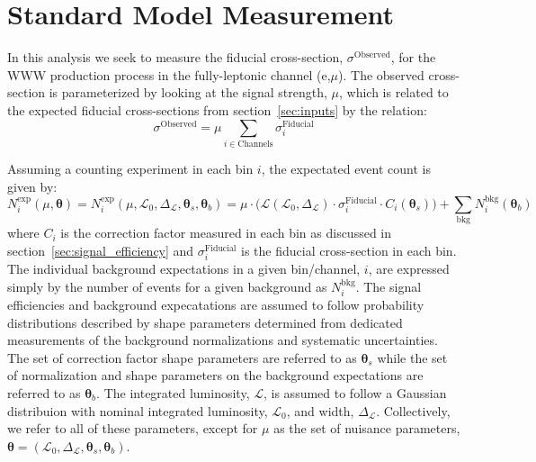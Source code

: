 

\section{Standard Model Measurement}
\label{sec:measurement}
\newcommand*\Diff[1]{\mathop{}\!\mathrm{d}#1~}
\newcommand{\boldtheta}{\boldsymbol{\theta}}
\newcommand{\thetas}{\boldsymbol{\theta}_s}
\newcommand{\thetab}{\boldsymbol{\theta}_b}
\newcommand{\curlyl}{\mathcal{L}}

In this analysis we seek to measure the 
fiducial cross-section, $\sigma^{\textrm{Observed}}$, for the 
WWW production process in the fully-leptonic channel (e,$\mu$).
The observed cross-section is parameterized by looking at the signal
strength, $\mu$, which is related to the expected fiducial cross-sections
from section~\ref{sec:inputs} by the relation:
\begin{equation}
\sigma^{\textrm{Observed}} = \mu \sum_{i\in \textrm{Channels}} \sigma^{\textrm{Fiducial}}_i
\end{equation}

Assuming a counting experiment in each bin $i$, the expectated 
event count is given by:
\begin{equation}
N^{\mathrm{exp}}_i(\mu,\boldtheta) = N^{\mathrm{exp}}_i(\mu,\curlyl_0,\Delta_{\curlyl},\thetas,\thetab) = \mu \cdot \bigg( \curlyl(\curlyl_0,\Delta_{\curlyl}) \cdot \sigma^{\mathrm{Fiducial}}_i \cdot C_i(\thetas) \bigg) + \sum_{\mathrm{bkg}} N_{i}^{\mathrm{bkg}}(\thetab)
\label{eq:poisson_expectation}
\end{equation}
where $C_i$ is the correction factor 
measured in each bin as discussed in section~\ref{sec:signal_efficiency} and 
$\sigma^{\mathrm{Fiducial}}_i$ is the fiducial cross-section in each 
bin. The 
individual background expectations in a given bin/channel, $i$, are 
expressed simply by the number of events
for a given background as $N^{\mathrm{bkg}}_i$. 
The signal efficiencies and background expecatations are assumed to follow 
probability distributions described by shape parameters determined from 
dedicated measurements of the background normalizations and systematic 
uncertainties.  
The set of correction factor shape parameters are referred to 
as $\thetas$ while the set of normalization and shape parameters on 
the background expectations are referred to as $\thetab$.
The integrated luminosity, $\curlyl$, is assumed to follow 
a Gaussian distribuion with nominal integrated 
luminosity, $\curlyl_0$, and width, $\Delta_{\curlyl}$. 
Collectively, we refer to all of these parameters, except 
for $\mu$ as the set of nuisance 
parameters, $\boldtheta = (\curlyl_0,\Delta_{\curlyl}, \thetas, \thetab)$. 

